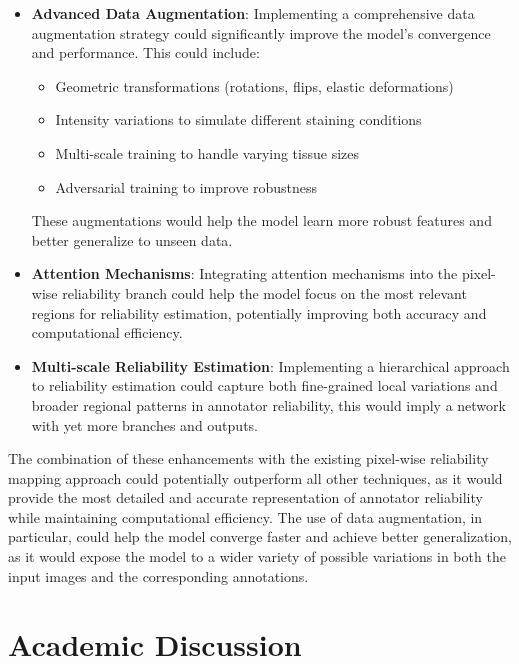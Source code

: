 \begin{itemize}
  \item \textbf{Advanced Data Augmentation}: Implementing a comprehensive
    data augmentation strategy could significantly improve the model's
    convergence and performance. This could include:
    \begin{itemize}
      \item Geometric transformations (rotations, flips, elastic deformations)
      \item Intensity variations to simulate different staining conditions
      \item Multi-scale training to handle varying tissue sizes
      \item Adversarial training to improve robustness
    \end{itemize}
    These augmentations would help the model learn more robust features
    and better generalize to unseen data.
  \item \textbf{Attention Mechanisms}: Integrating attention mechanisms
    into the pixel-wise reliability branch could help the model focus
    on the most relevant regions for reliability estimation, potentially
    improving both accuracy and computational efficiency.
  \item \textbf{Multi-scale Reliability Estimation}: Implementing a
    hierarchical approach to reliability estimation could capture
    both fine-grained local variations and broader regional patterns
    in annotator reliability, this would imply a network with yet
    more branches and outputs.
\end{itemize}

The combination of these enhancements with the existing pixel-wise
reliability mapping approach could potentially outperform all other
techniques, as it would provide the most detailed and accurate
representation of annotator reliability while maintaining computational
efficiency. The use of data augmentation, in particular, could help
the model converge faster and achieve better generalization, as it
would expose the model to a wider variety of possible variations in
both the input images and the corresponding annotations.

\section{Academic Discussion}\label{sec:academic_discussion}


